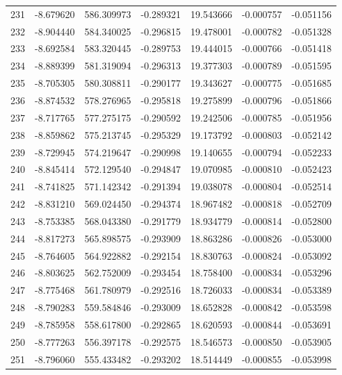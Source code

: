 \begin{tabular}{rrrrrrr}
 231 &  -8.679620 &  586.309973 & -0.289321 &  19.543666 &  -0.000757 & -0.051156 \\
 232 &  -8.904440 &  584.340025 & -0.296815 &  19.478001 &  -0.000782 & -0.051328 \\
 233 &  -8.692584 &  583.320445 & -0.289753 &  19.444015 &  -0.000766 & -0.051418 \\
 234 &  -8.889399 &  581.319094 & -0.296313 &  19.377303 &  -0.000789 & -0.051595 \\
 235 &  -8.705305 &  580.308811 & -0.290177 &  19.343627 &  -0.000775 & -0.051685 \\
 236 &  -8.874532 &  578.276965 & -0.295818 &  19.275899 &  -0.000796 & -0.051866 \\
 237 &  -8.717765 &  577.275175 & -0.290592 &  19.242506 &  -0.000785 & -0.051956 \\
 238 &  -8.859862 &  575.213745 & -0.295329 &  19.173792 &  -0.000803 & -0.052142 \\
 239 &  -8.729945 &  574.219647 & -0.290998 &  19.140655 &  -0.000794 & -0.052233 \\
 240 &  -8.845414 &  572.129540 & -0.294847 &  19.070985 &  -0.000810 & -0.052423 \\
 241 &  -8.741825 &  571.142342 & -0.291394 &  19.038078 &  -0.000804 & -0.052514 \\
 242 &  -8.831210 &  569.024450 & -0.294374 &  18.967482 &  -0.000818 & -0.052709 \\
 243 &  -8.753385 &  568.043380 & -0.291779 &  18.934779 &  -0.000814 & -0.052800 \\
 244 &  -8.817273 &  565.898575 & -0.293909 &  18.863286 &  -0.000826 & -0.053000 \\
 245 &  -8.764605 &  564.922882 & -0.292154 &  18.830763 &  -0.000824 & -0.053092 \\
 246 &  -8.803625 &  562.752009 & -0.293454 &  18.758400 &  -0.000834 & -0.053296 \\
 247 &  -8.775468 &  561.780979 & -0.292516 &  18.726033 &  -0.000834 & -0.053389 \\
 248 &  -8.790283 &  559.584846 & -0.293009 &  18.652828 &  -0.000842 & -0.053598 \\
 249 &  -8.785958 &  558.617800 & -0.292865 &  18.620593 &  -0.000844 & -0.053691 \\
 250 &  -8.777263 &  556.397178 & -0.292575 &  18.546573 &  -0.000850 & -0.053905 \\
 251 &  -8.796060 &  555.433482 & -0.293202 &  18.514449 &  -0.000855 & -0.053998 \\

\end{tabular}
